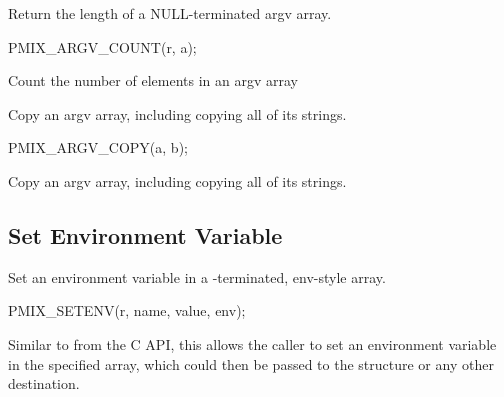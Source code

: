 Return the length of a NULL-terminated argv array.

\cspecificstart
\begin{codepar}
PMIX_ARGV_COUNT(r, a);
\end{codepar}
\cspecificend

\begin{arglist}
\end{arglist}

Count the number of elements in an argv array


Copy an argv array, including copying all of its strings.

\cspecificstart
\begin{codepar}
PMIX_ARGV_COPY(a, b);
\end{codepar}
\cspecificend

\begin{arglist}
\end{arglist}

Copy an argv array, including copying all of its strings.


\subsection{Set Environment Variable}

\summary

Set an environment variable in a -terminated, env-style array.

\cspecificstart
\begin{codepar}
PMIX_SETENV(r, name, value, env);
\end{codepar}
\cspecificend


\begin{arglist}
\end{arglist}

\descr

Similar to  from the C API, this allows the caller to set an environment variable in the specified  array, which could then be passed to the  structure or any other destination.

